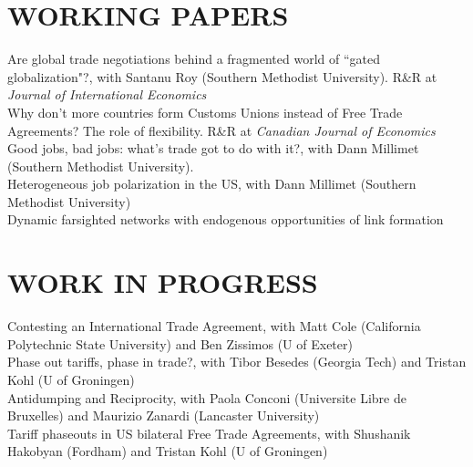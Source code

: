 \documentclass[11pt]{res}
\begin{document}
\begin{resume}
\section{WORKING PAPERS}\vspace{1.5mm}
{Are global trade negotiations behind a fragmented world of ``gated globalization"?}, with Santanu Roy (Southern Methodist University). R\&R at \emph{Journal of International Economics}\vspace{1.5mm}\\
{Why don't more countries form Customs Unions instead of Free Trade Agreements? The role of flexibility}. R\&R at \emph{Canadian Journal of Economics} \vspace{1.5mm}\\
{Good jobs, bad jobs: what's trade got to do with it?}, with Dann Millimet (Southern Methodist University).\vspace{1.5mm}\\
{Heterogeneous job polarization in the US}, with Dann Millimet (Southern Methodist University)\vspace{1.5mm}\\
{Dynamic farsighted networks with endogenous opportunities of link formation} \vspace{1.5mm}\\

\section{WORK IN PROGRESS}\vspace{1.5mm}
Contesting an International Trade Agreement, with Matt Cole (California Polytechnic State University) and Ben Zissimos (U of Exeter) \vspace{1.5mm}\\
Phase out tariffs, phase in trade?, with Tibor Besedes (Georgia Tech) and Tristan Kohl (U of Groningen) \vspace{1.5mm}\\
Antidumping and Reciprocity, with Paola Conconi (Universite Libre de Bruxelles) and Maurizio Zanardi (Lancaster University) \vspace{1.5mm}\\
Tariff phaseouts in US bilateral Free Trade Agreements, with Shushanik Hakobyan (Fordham) and Tristan Kohl (U of Groningen)\\


\end{resume}
\end{document}
